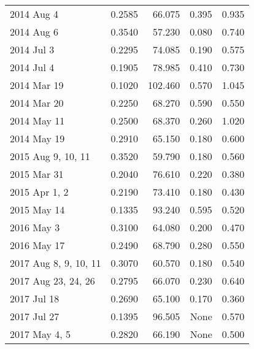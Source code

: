 \begin{tabular}{lrrrr}
            2014 Aug 4 &  0.2585 &   66.075 &  0.395 &  0.935 \\
            2014 Aug 6 &  0.3540 &   57.230 &  0.080 &  0.740 \\
            2014 Jul 3 &  0.2295 &   74.085 &  0.190 &  0.575 \\
            2014 Jul 4 &  0.1905 &   78.985 &  0.410 &  0.730 \\
           2014 Mar 19 &  0.1020 &  102.460 &  0.570 &  1.045 \\
           2014 Mar 20 &  0.2250 &   68.270 &  0.590 &  0.550 \\
           2014 May 11 &  0.2500 &   68.370 &  0.260 &  1.020 \\
           2014 May 19 &  0.2910 &   65.150 &  0.180 &  0.600 \\
    2015 Aug 9, 10, 11 &  0.3520 &   59.790 &  0.180 &  0.560 \\
           2015 Mar 31 &  0.2040 &   76.610 &  0.220 &  0.380 \\
         2015 Apr 1, 2 &  0.2190 &   73.410 &  0.180 &  0.430 \\
           2015 May 14 &  0.1335 &   93.240 &  0.595 &  0.520 \\
            2016 May 3 &  0.3100 &   64.080 &  0.200 &  0.470 \\
           2016 May 17 &  0.2490 &   68.790 &  0.280 &  0.550 \\
 2017 Aug 8, 9, 10, 11 &  0.3070 &   60.570 &  0.180 &  0.540 \\
   2017 Aug 23, 24, 26 &  0.2795 &   66.070 &  0.230 &  0.640 \\
           2017 Jul 18 &  0.2690 &   65.100 &  0.170 &  0.360 \\
           2017 Jul 27 &  0.1395 &   96.505 &   None &  0.570 \\
         2017 May 4, 5 &  0.2820 &   66.190 &   None &  0.500 \\
\bottomrule
\end{tabular}

